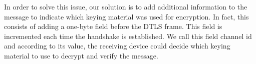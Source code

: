 In order to solve this issue, our solution is to add additional information to the message to indicate which keying material was
used for encryption. In fact, this consists of adding a one-byte field before the DTLS frame. This field is incremented each
time the handshake is established. We call this field channel id and according to its value, the receiving device could decide
which keying material to use to decrypt and verify the message.






